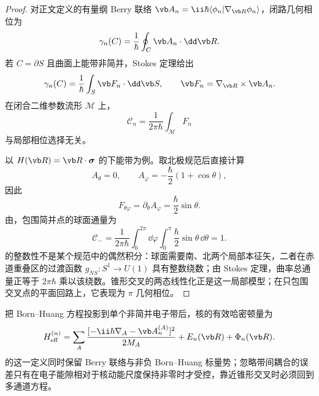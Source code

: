 \begin{proof}
对正文定义的有量纲 Berry 联络
\(\vb A_n=\ii\hbar\langle\phi_n|\nabla_{\vb R}\phi_n\rangle\)，闭路几何相位为
\begin{equation}
 \gamma_n(C)=\frac1\hbar\oint_C\vb A_n\cdot\dd\vb R .
 \label{eq:berry-phase-circuit}
\end{equation}
若 \(C=\partial S\) 且曲面上能带非简并，Stokes 定理给出
\begin{equation}
 \gamma_n(C)=\frac1\hbar\int_S\vb F_n\cdot\dd\vb S,
 \qquad \vb F_n=\nabla_{\vb R}\times\vb A_n .
 \label{eq:berry-stokes}
\end{equation}
在闭合二维参数流形 \(\mathcal M\) 上，
\begin{equation}
 \mathcal C_n=\frac1{2\pi\hbar}\int_{\mathcal M}F_n
 \label{eq:chern-number-definition}
\end{equation}
与局部相位选择无关。

以 \(H(\vb R)=\vb R\cdot\boldsymbol\sigma\) 的下能带为例。取北极规范后直接计算
\[
 A_\theta=0,\qquad A_\varphi=-\frac{\hbar}{2}(1+\cos\theta),
\]
因此
\begin{equation}
 F_{\theta\varphi}=\partial_\theta A_\varphi
 =\frac{\hbar}{2}\sin\theta .
 \label{eq:two-level-berry-curvature}
\end{equation}
由，包围简并点的球面通量为
\begin{equation}
 \mathcal C_-=\frac1{2\pi\hbar}
 \int_0^{2\pi}\!\dd\varphi\int_0^\pi
 \frac{\hbar}{2}\sin\theta\,\dd\theta=1 .
 \label{eq:chern-number-quantization}
\end{equation}
 的整数性不是某个规范中的偶然积分：球面需要南、北两个局部本征矢，二者在赤道重叠区的过渡函数
\(g_{NS}:S^1\to U(1)\) 具有整数绕数；由 Stokes 定理，曲率总通量正等于
\(2\pi\hbar\) 乘以该绕数。锥形交叉的两态线性化正是这一局部模型；在只包围交叉点的平面回路上，它表现为 \(\pi\) 几何相位。
\end{proof}

把 Born--Huang 方程投影到单个非简并电子带后，核的有效哈密顿量为
\begin{equation}
 H_{\rm eff}^{(n)}
 =\sum_A\frac{[-\ii\hbar\nabla_A-\vb A_n^{(A)}]^2}{2M_A}
 +E_n(\vb R)+\Phi_n(\vb R).
 \label{eq:phys-bh-bo-effective}
\end{equation}
 的这一定义同时保留 Berry 联络与非负 Born--Huang 标量势；忽略带间耦合的误差只有在电子能隙相对于核动能尺度保持非零时才受控，靠近锥形交叉时必须回到多通道方程。
